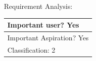 Requirement Analysis:

\begin{tabular}{|p{433pt}|} \hline
Important user? Yes \\ \hline
Important Aspiration? Yes \\ \hline
Classification: 2 \\ \hline
\end{tabular}
\vspace{24pt}

